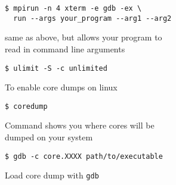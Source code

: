 \documentclass[10pt, a4paper, english, parskip, twocolumn]{scrartcl}
\newcommand{\code}[1]{\texttt{#1}}
\newcommand{\gdbsection}[1]{\begin{mdframed}[frametitlebackgroundcolor=bittersweet,style=section,
frametitle=#1]\end{mdframed}}
\begin{document}
\begin{lstlisting}[belowskip=-0.8 \baselineskip]
$ mpirun -n 4 xterm -e gdb -ex \
  run --args your_program --arg1 --arg2
\end{lstlisting}
\quad\quad same as above, but allows your program to \\
\quad\quad read in command line arguments







\gdbsection{gdb and core dumps}

\begin{lstlisting}[belowskip=-0.8 \baselineskip]
$ ulimit -S -c unlimited
\end{lstlisting}
\quad\quad To enable core dumps on linux

\begin{lstlisting}[belowskip=-0.8 \baselineskip]
$ coredump
\end{lstlisting}
\quad\quad Command shows you where cores will be \\
\quad\quad dumped on your system

\begin{lstlisting}[belowskip=-0.8 \baselineskip]
$ gdb -c core.XXXX path/to/executable
\end{lstlisting}
\quad\quad Load core dump with \code{gdb}









\gdbsection{gdb breakpoints}
\end{document}
